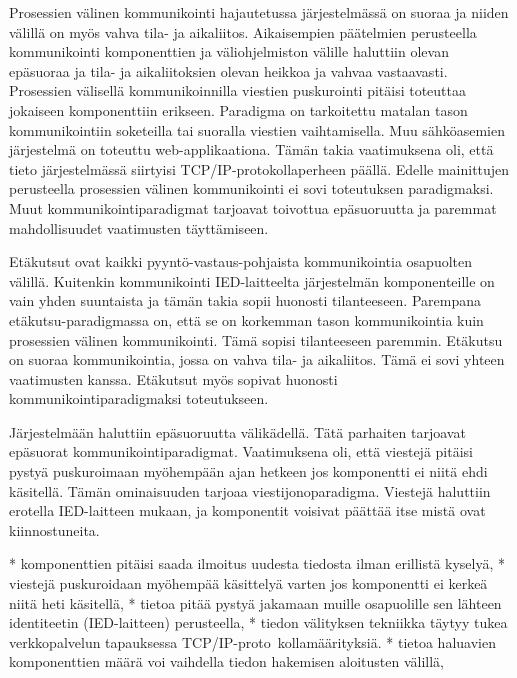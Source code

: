 
Prosessien välinen kommunikointi hajautetussa järjestelmässä on suoraa ja niiden välillä on myös vahva tila- ja aikaliitos. Aikaisempien päätelmien perusteella kommunikointi komponenttien ja väliohjelmiston välille haluttiin olevan epäsuoraa ja tila- ja aikaliitoksien olevan heikkoa ja vahvaa vastaavasti. Prosessien välisellä kommunikoinnilla viestien puskurointi pitäisi toteuttaa jokaiseen komponenttiin erikseen. Paradigma on tarkoitettu matalan tason kommunikointiin soketeilla tai suoralla viestien vaihtamisella. Muu sähköasemien järjestelmä on toteuttu web-applikaationa. Tämän takia vaatimuksena oli, että tieto järjestelmässä siirtyisi TCP/IP-protokollaperheen päällä. Edelle mainittujen perusteella prosessien välinen kommunikointi ei sovi toteutuksen paradigmaksi. Muut kommunikointiparadigmat tarjoavat toivottua epäsuoruutta ja paremmat mahdollisuudet vaatimusten täyttämiseen.

Etäkutsut ovat kaikki pyyntö-vastaus-pohjaista kommunikointia osapuolten välillä. Kuitenkin kommunikointi IED-laitteelta järjestelmän komponenteille on vain yhden suuntaista ja tämän takia sopii huonosti tilanteeseen. Parempana etäkutsu-paradigmassa on, että se on korkemman tason kommunikointia kuin prosessien välinen kommunikointi. Tämä sopisi tilanteeseen paremmin. Etäkutsu on suoraa kommunikointia, jossa on vahva tila- ja aikaliitos. Tämä ei sovi yhteen vaatimusten kanssa. Etäkutsut myös sopivat huonosti kommunikointiparadigmaksi toteutukseen.


Järjestelmään haluttiin epäsuoruutta välikädellä. Tätä parhaiten tarjoavat epäsuorat kommunikointiparadigmat. Vaatimuksena oli, että viestejä pitäisi pystyä puskuroimaan myöhempään ajan hetkeen jos komponentti ei niitä ehdi käsitellä. Tämän ominaisuuden tarjoaa viestijonoparadigma. Viestejä haluttiin erotella IED-laitteen mukaan, ja komponentit voisivat päättää itse mistä ovat kiinnostuneita. 

* komponenttien pitäisi saada ilmoitus uudesta tiedosta ilman erillistä kyselyä,
* viestejä puskuroidaan myöhempää käsittelyä varten jos komponentti ei kerkeä niitä heti käsitellä,
* tietoa pitää pystyä jakamaan muille osapuolille sen lähteen identiteetin (IED-laitteen) perusteella,
* tiedon välityksen tekniikka täytyy tukea verkkopalvelun tapauksessa TCP/IP-pro\-to \-kol\-la\-mää\-ri\-tyk\-si\-ä.
* tietoa haluavien komponenttien määrä voi vaihdella tiedon hakemisen aloitusten välillä,



